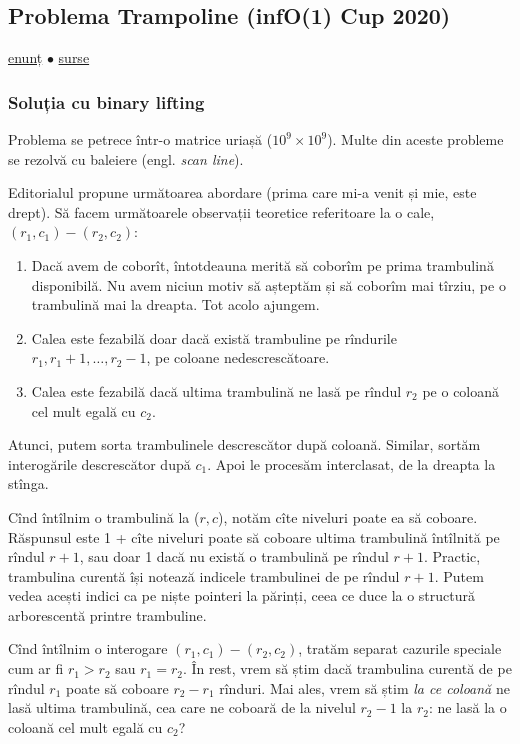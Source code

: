 \documentclass[../main.tex]{subfiles}
\begin{document}
\subsection{Problema Trampoline (infO(1) Cup 2020)}
\label{problem:trampoline}

\href{https://kilonova.ro/problems/3275}{enunț}
$\bullet$
\hyperref[code:trampoline]{surse}

\subsubsection*{Soluția cu binary lifting}

Problema se petrece într-o matrice uriașă ($10^9 \times 10^9$). Multe din aceste probleme se rezolvă cu baleiere (engl. \textit{scan line}).

Editorialul propune următoarea abordare (prima care mi-a venit și mie, este drept). Să facem următoarele observații teoretice referitoare la o  cale, $(r_1,c_1)-(r_2,c_2)$:

\begin{enumerate}
  \item Dacă avem de coborît, întotdeauna merită să coborîm pe prima trambulină disponibilă. Nu avem niciun motiv să așteptăm și să coborîm mai tîrziu, pe o trambulină mai la dreapta. Tot acolo ajungem.

  \item Calea este fezabilă doar dacă există trambuline pe rîndurile $r_1, r_1 + 1, \dots, r_2 - 1$, pe coloane nedescrescătoare.

  \item Calea este fezabilă dacă ultima trambulină ne lasă pe rîndul  $r_2$ pe o coloană cel mult egală cu $c_2$.
\end{enumerate}

Atunci, putem sorta trambulinele descrescător după coloană. Similar, sortăm interogările descrescător după $c_1$. Apoi le procesăm interclasat, de la dreapta la stînga.

Cînd întîlnim o trambulină la ($r,c$), notăm cîte niveluri poate ea să coboare. Răspunsul este 1 + cîte niveluri poate să coboare ultima trambulină întîlnită pe rîndul $r + 1$, sau doar 1 dacă nu există o trambulină pe rîndul $r + 1$. Practic, trambulina curentă își notează indicele trambulinei de pe rîndul $r + 1$. Putem vedea acești indici ca pe niște pointeri la părinți, ceea ce duce la o structură arborescentă printre trambuline.

Cînd întîlnim o interogare $(r_1,c_1)-(r_2,c_2)$, tratăm separat cazurile speciale cum ar fi $r_1 > r_2$ sau $r_1 = r_2$. În rest, vrem să știm dacă trambulina curentă de pe rîndul $r_1$ poate să coboare $r_2 - r_1$ rînduri. Mai ales, vrem să știm \textit{la ce coloană} ne lasă ultima trambulină, cea care ne coboară de la nivelul $r_2 - 1$ la $r_2$: ne lasă la o coloană cel mult egală cu $c_2$?
\end{document}
